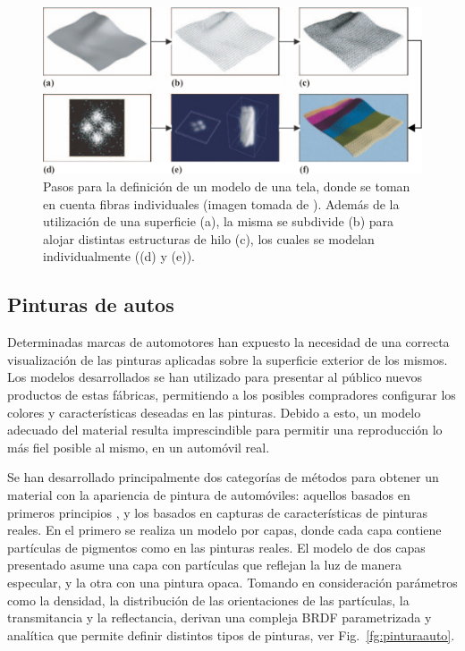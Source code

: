 \begin{figure}
\center
\includegraphics[width=13cm]{figures/tela}
\caption[Pasos para la definición de un modelo de una tela]{Pasos para la definición de un modelo de una tela, donde se toman en cuenta fibras individuales (imagen tomada de \cite{Xu2001}). Además de la utilización de una superficie (a), la misma se subdivide (b) para alojar distintas estructuras de hilo (c), los cuales se modelan individualmente ((d) y (e)).}
\label{fg:tela}
\end{figure}

\subsection{Pinturas de autos}
Determinadas marcas de automotores han expuesto la necesidad de una correcta visualización de las pinturas aplicadas sobre la superficie exterior de los mismos.
Los modelos desarrollados se han utilizado para presentar al público nuevos productos de estas fábricas, permitiendo a los posibles compradores configurar los colores y características deseadas en las pinturas.
Debido a esto, un modelo adecuado del material resulta imprescindible para permitir una reproducción lo más fiel posible al mismo, en un automóvil real.

Se han desarrollado principalmente dos categorías de métodos para obtener un material con la apariencia de pintura de automóviles: aquellos basados en primeros principios \cite{Ershov2001}, y los basados en capturas de características de pinturas reales.
En el primero se realiza un modelo por capas, donde cada capa contiene partículas de pigmentos como en las pinturas reales.
El modelo de dos capas presentado asume una capa con partículas que reflejan la luz de manera especular, y la otra con una pintura opaca.
Tomando en consideración parámetros como la densidad, la distribución de las orientaciones de las partículas, la transmitancia y la reflectancia, derivan una compleja BRDF parametrizada y analítica que permite definir distintos tipos de pinturas, ver Fig.~\ref{fg:pinturaauto}.

